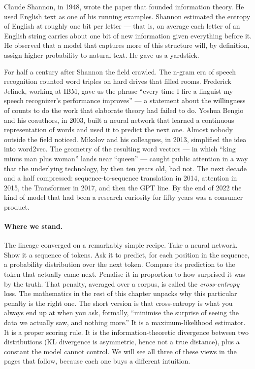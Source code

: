 Claude Shannon, in 1948, wrote the paper that founded information
theory. He used English text as one of his running examples.
Shannon estimated the entropy of English at roughly one bit per
letter --- that is, on average each letter of an English string
carries about one bit of new information given everything before
it. He observed that a model that captures more of this structure
will, by definition, assign higher probability to natural text. He
gave us a yardstick.

For half a century after Shannon the field crawled. The n-gram
era of speech recognition counted word triples on hard drives
that filled rooms. Frederick Jelinek, working at IBM, gave us the
phrase ``every time I fire a linguist my speech recognizer's
performance improves'' --- a statement about the willingness of
counts to do the work that elaborate theory had failed to do.
Yoshua Bengio and his coauthors, in 2003, built a neural network
that learned a continuous representation of words and used it to
predict the next one. Almost nobody outside the field noticed.
Mikolov and his colleagues, in 2013, simplified the idea into
word2vec. The geometry of the resulting word vectors --- in which
``king minus man plus woman'' lands near ``queen'' --- caught
public attention in a way that the underlying technology, by then
ten years old, had not. The next decade and a half compressed:
sequence-to-sequence translation in 2014, attention in 2015, the
Transformer in 2017, and then the GPT line. By the end of 2022
the kind of model that had been a research curiosity for fifty
years was a consumer product.

\paragraph{Where we stand.} The lineage converged on a remarkably
simple recipe. Take a neural network. Show it a sequence of
tokens. Ask it to predict, for each position in the sequence, a
probability distribution over the next token. Compare its
prediction to the token that actually came next. Penalise it in
proportion to how surprised it was by the truth. That penalty,
averaged over a corpus, is called the \emph{cross-entropy} loss.
The mathematics in the rest of this chapter unpacks why this
particular penalty is the right one. The short version is that
cross-entropy is what you always end up at when you ask, formally,
``minimise the surprise of seeing the data we actually saw, and
nothing more.'' It is a maximum-likelihood estimator. It is a
proper scoring rule. It is the information-theoretic divergence
between two distributions (KL divergence is asymmetric, hence not a
true distance), plus a constant the model cannot control. We will see all three of these views in the pages that
follow, because each one buys a different intuition.

